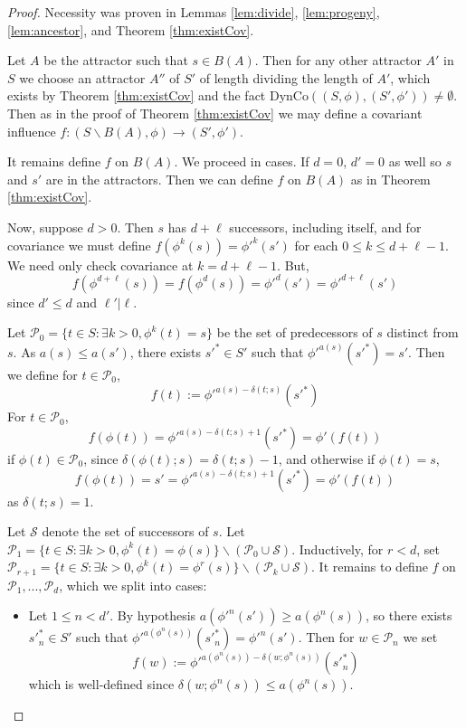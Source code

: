 \begin{proof}
    Necessity was proven in Lemmas \ref{lem:divide}, \ref{lem:progeny}, \ref{lem:ancestor}, and Theorem \ref{thm:existCov}. 

    
    Let $A$ be the attractor such that $s \in B(A)$. Then for any other attractor $A'$ in $S$ we choose an attractor $A''$ of $S'$ of length dividing the length of $A'$, which exists by Theorem \ref{thm:existCov} and the fact $\text{DynCo}((S,\phi),(S',\phi')) \neq \emptyset$. Then as in the proof of Theorem \ref{thm:existCov} we may define a covariant influence $f:(S\backslash B(A),\phi)\rightarrow (S',\phi')$.


    It remains define $f$ on $B(A)$. We proceed in cases. If $d = 0$, $d' = 0$ as well so $s$ and $s'$ are in the attractors. Then we can define $f$ on $B(A)$ as in Theorem \ref{thm:existCov}.

    Now, suppose $d > 0$. Then $s$ has $d+\ell$ successors, including itself, and for covariance we must define $f(\phi^k(s)) = {\phi'}^k(s')$ for each $0 \leq k \leq d+\ell-1$. We need only check covariance at $k = d+\ell-1$. But, $$f(\phi^{d+\ell}(s)) = f(\phi^d(s)) = {\phi'}^d(s') = {\phi'}^{d+\ell}(s')$$
    since $d' \leq d$ and $\ell' \vert \ell$.


    Let $\mathcal{P}_0 = \{t \in S:\exists k > 0, \phi^k(t) = s\}$ be the set of predecessors of $s$ distinct from $s$. As $a(s) \leq a(s')$, there exists ${s'}^* \in S'$ such that ${\phi'}^{a(s)}({s'}^*) = s'$. Then we define for $t \in \mathcal{P}_0$, $$f(t) := {\phi'}^{a(s)-\delta(t;s)}({s'}^*)$$
    For $t \in \mathcal{P}_0$, 
    $$f(\phi(t)) = {\phi'}^{a(s)-\delta(t;s)+1}({s'}^*) = \phi'(f(t))$$
    if $\phi(t) \in \mathcal{P}_0$, since $\delta(\phi(t);s) = \delta(t;s)-1$, and otherwise if $\phi(t) = s$, $$f(\phi(t)) = s' = {\phi'}^{a(s)-\delta(t;s)+1}({s'}^*) = \phi'(f(t))$$
    as $\delta(t;s) = 1$.


    Let $\mathcal{S}$ denote the set of successors of $s$. Let $\mathcal{P}_1 = \{t \in S:\exists k > 0, \phi^k(t) = \phi(s)\}\backslash (\mathcal{P}_0\cup \mathcal{S})$. Inductively, for $r < d$, set $\mathcal{P}_{r+1} = \{t \in S:\exists k > 0,\phi^k(t) = \phi^r(s)\}\backslash(\mathcal{P}_k\cup\mathcal{S})$. It remains to define $f$ on $\mathcal{P}_1,...,\mathcal{P}_d$, which we split into cases:
    \begin{itemize}
        \item Let $1\leq n < d'$. By hypothesis $a({\phi'}^n(s')) \geq a(\phi^n(s))$, so there exists ${s'}_n^* \in S'$ such that ${\phi'}^{a(\phi^n(s))}({s'}_n^*) = {\phi'}^n(s')$. Then for $w \in \mathcal{P}_n$ we set 
        \begin{equation*}
            f(w) :={\phi'}^{a(\phi^n(s))-\delta(w;\phi^n(s))}({s'}_n^*)
        \end{equation*}
        which is well-defined since $\delta(w;\phi^n(s)) \leq a(\phi^n(s))$. 


\end{itemize}
\end{proof}
